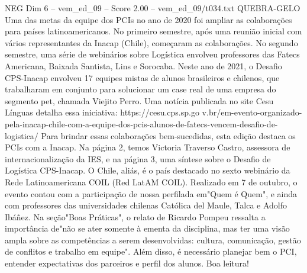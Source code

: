 \begin{textsample}{NEG Dim 6 – vem\_ed\_09 – Score 2.00 – vem\_ed\_09/t034.txt}  \label{ex:f6_neg_028}
QUEBRA-GELO Uma das metas da equipe dos PCIs no ano de 2020 foi ampliar as colaborações para países latinoamericanos.
No primeiro semestre, após uma reunião inicial com vários representantes da Inacap (Chile), começaram as colaborações.
No segundo semestre, uma série de webinários sobre Logística envolveu professores das Fatecs Americana, Baixada Santista, Lins e Sorocaba.
Neste ano de 2021, o Desafio CPS-Inacap envolveu 17 equipes mistas de alunos brasileiros e chilenos, que trabalharam em conjunto para solucionar um case real de uma empresa do segmento pet, chamada Viejito Perro.
Uma notícia publicada no site Cesu Línguas detalha essa iniciativa: https://cesu.cps.sp.go v.br/em-evento-organizado-pela-inacap-chile-com-a-equipe-dos-pcis-alunos-de-fatecs-vencem-desafio-de-logistica/ Para brindar essas colaborações bem-sucedidas, esta edição destaca os PCIs com a Inacap.
Na página 2, temos Victoria Traverso Castro, assessora de internacionalização da IES, e na página 3, uma síntese sobre o Desafio de Logística CPS-Inacap.
O Chile, aliás, é o país destacado no sexto webinário da Rede Latinoamericana COIL (Red LatAM COIL).
Realizado em 7 de outubro, o evento contou com a participação de nossa perfilada em"Quem é Quem", e ainda com professores das universidades chilenas Católica del Maule, Talca e Adolfo Ibáñez.
Na seção"Boas Práticas", o relato de Ricardo Pompeu ressalta a importância de"não se ater somente à ementa da disciplina, mas ter uma visão ampla sobre as competências a serem desenvolvidas: cultura, comunicação, gestão de conflitos e trabalho em equipe".
Além disso, é necessário planejar bem o PCI, entender expectativas dos parceiros e perfil dos alunos.
Boa leitura!

\end{textsample}
